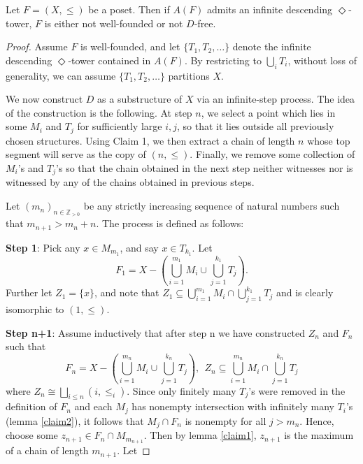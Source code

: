 \documentclass[submission]{eptcs}
\begin{document}
\begin{lemma}\label{lemma:tower&wf_implies_Dfree}
    Let $F=(X,\leq)$ be a poset. Then if $A(F)$ admits an infinite descending $\Diamond$-tower, $F$ is either not well-founded or not $D$-free.
\end{lemma}

\begin{proof}
    Assume $F$ is well-founded, and 
    let $\{T_1,T_2,\dots\}$ denote the infinite descending $\Diamond$-tower contained in $A(F)$. 
    By restricting to $\bigcup_{i}T_i$, without loss of generality, we can assume $\{T_1,T_2,\dots\}$ partitions $X$.
    \par
    We now construct $D$ as a substructure of $X$ via an infinite-step process. 
    The idea of the construction is the following. At step $n$, we select a point which lies in some $M_i$ and $T_j$ for sufficiently large $i,j$,
    so that it lies outside all previously chosen structures. 
    Using Claim 1, we then extract a chain of length $n$ whose top segment will serve as the copy of $(n,\leq)$. 
    Finally, we remove some collection of $M_i$'s and $T_j$'s so that the chain obtained in the next step neither witnesses nor is witnessed by any of the chains obtained in previous steps.
    \par
    Let $(m_n)_{n \in \mathbb{Z}_{>0}}$ be any strictly increasing sequence of natural numbers such that $m_{n+1}> m_n+n$.
    The process is defined as follows:
    \par \smallskip
    \textbf{Step 1}: Pick any $x\in M_{m_1}$, and say $x \in T_{k_1}$. Let
    \[
    F_1=X-(\bigcup_{i=1}^{m_1} M_i \cup \bigcup_{j=1}^{k_1} T_j).
    \]
    Further let $Z_{1}=\{x\}$, and note that $Z_1\subseteq \bigcup_{i=1}^{m_1}M_i \cap \bigcup_{j=1}^{k_1}T_j$ and is clearly isomorphic to $(1,\leq)$.
    \par \smallskip
    \textbf{Step n+1}: Assume inductively that after step n we have constructed $Z_n$ and $F_n$ such that 
    \[
    F_n=X-(\bigcup_{i=1}^{m_n} M_i \cup \bigcup_{j=1}^{k_n} T_j), \ \ Z_n \subseteq \bigcup_{i=1}^{m_n} M_i \cap \bigcup_{j=1}^{k_n}T_j
    \] 
    where $Z_n \cong \bigsqcup_{i\leq n}(i,\leq_i)$.
    Since only finitely many $T_j$'s were removed in the definition of $F_n$ and each $M_j$ has nonempty intersection with infinitely many $T_i$'s (lemma \ref{claim2}), it follows that $M_j \cap F_n$ is nonempty for all $j>m_n$.
    Hence, choose some $z_{n+1} \in F_n \cap M_{m_{n+1}}$. 
    Then by lemma \ref{claim1}, $z_{n+1}$ is the maximum of a chain of length $m_{n+1}$. Let

\end{proof}
\end{document}

